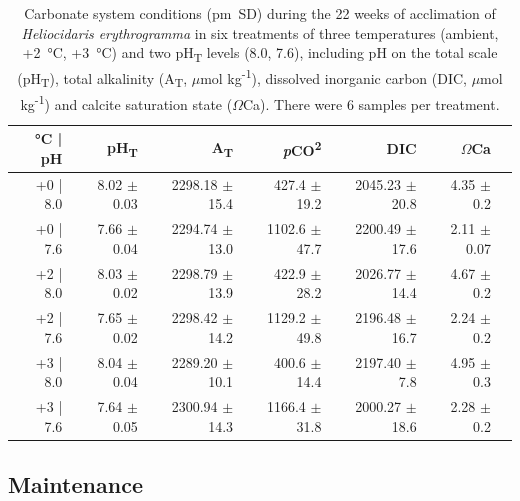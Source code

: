 \documentclass[a4paper,10pt, oneside]{memoir}
\begin{document}
\begin{table}[tb]
\centering
\caption[Carbonate system conditions during the 22 weeks of acclimation of \textit{Heliocidaris erythrogramma} in six treatments of three temperatures and two pH\textsubscript{T} levels.]{Carbonate system conditions (\si{\pm SD}) during the 22 weeks of acclimation of \textit{Heliocidaris erythrogramma} in six treatments of three temperatures (ambient, +\SI{2}{\celsius}, +\SI{3}{\celsius}) and two pH\textsubscript{T} levels (8.0, 7.6), including pH on the total scale (pH\textsubscript{T}), total alkalinity (A\textsubscript{T}, $\mu$mol kg\textsuperscript{-1}), dissolved inorganic carbon (DIC, $\mu$mol kg\textsuperscript{-1}) and calcite saturation state ($\Omega$Ca). There were 6 samples per treatment.}
\label{carbchemtab}
\begin{tabular}{rrrrrrr}
\toprule
\si{\celsius} | pH & pH\textsubscript{T} & A\textsubscript{T} & \textit{p}CO\textsuperscript{2} & DIC & $\Omega$Ca \\
\midrule
+0 | 8.0 & 8.02 $\pm$ 0.03 & 2298.18 $\pm$ 15.4 & 427.4 $\pm$ 19.2 & 2045.23 $\pm$ 20.8 & 4.35 $\pm$ 0.2 \\
+0 | 7.6 & 7.66 $\pm$ 0.04 & 2294.74 $\pm$ 13.0 & 1102.6 $\pm$ 47.7 & 2200.49 $\pm$ 17.6 & 2.11 $\pm$ 0.07 \\
+2 | 8.0 & 8.03 $\pm$ 0.02 & 2298.79 $\pm$ 13.9 & 422.9 $\pm$ 28.2 & 2026.77 $\pm$ 14.4 & 4.67 $\pm$ 0.2 \\
+2 | 7.6 & 7.65 $\pm$ 0.02 & 2298.42 $\pm$ 14.2 & 1129.2 $\pm$ 49.8 & 2196.48 $\pm$ 16.7 & 2.24 $\pm$ 0.2 \\
+3 | 8.0 & 8.04 $\pm$ 0.04 & 2289.20 $\pm$ 10.1 & 400.6 $\pm$ 14.4 & 2197.40 $\pm$ 7.8 & 4.95 $\pm$ 0.3 \\
+3 | 7.6 & 7.64 $\pm$ 0.05 & 2300.94 $\pm$ 14.3 & 1166.4 $\pm$ 31.8 & 2000.27 $\pm$ 18.6 & 2.28 $\pm$ 0.2 \\
\bottomrule
\end{tabular}
\end{table}

\hypertarget{maintenance}{%
\subsection{Maintenance}\label{maintenance}}
\end{document}
